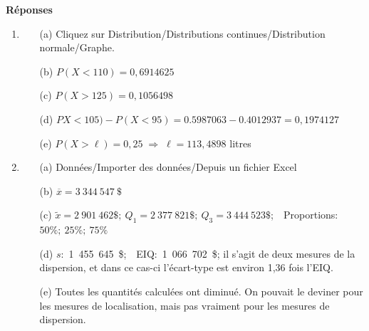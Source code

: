 \documentclass[12pt]{article}
\begin{document}


\vspace{2mm}

\underline{\hspace{16cm}}
\vspace{2mm}

{\bf Réponses}

\small

\begin{enumerate}
\item  \begin{enumerate}
\item[(a)] Cliquez sur Distribution/Distributions continues/Distribution normale/Graphe.
\item[(b)] $P(X<110)=0,6914625$
\item[(c)] $P(X>125)=0,1056498$
\item[(d)] $PX<105)-P(X<95)=0.5987063-0.4012937=0,1974127$
\item[(e)] $P(X>\ell)=0,25\;\Rightarrow\;\ell=113,4898$ litres
\end{enumerate}

\newpage
\vspace*{1mm}
\item  \begin{enumerate}
\item[(a)] Données/Importer des données/Depuis un fichier Excel
\item[(b)] $\overline x=3~344~547~\$$
\item[(c)] $\widetilde x=2~901~462\$;~ Q_1=2~377~821\$;~Q_3=3~444~523\$ $;~~Proportions: $ 50\%;~25\%;~75\%$
\item[(d)] $s$:~1~455~645~\$;~~EIQ:~1~066~702~\$; il s'agit de deux mesures de la dispersion, et dans ce cas-ci l'écart-type est environ 1,36 fois l'EIQ.
\item[(e)] Toutes les quantités calculées ont diminué. On pouvait le deviner pour les mesures de localisation, mais pas vraiment pour les mesures de dispersion.
\end{enumerate}


\end{enumerate}
\end{document}

